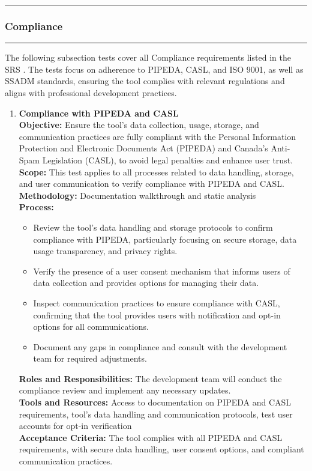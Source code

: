 \documentclass[12pt, titlepage]{article}
\newcommand{\colorrule}{\textcolor{BlueViolet}{\rule{\linewidth}{2pt}}}
\begin{document}
\newpage

\noindent
\colorrule

\subsubsection{Compliance}
\colorrule

\medskip

\noindent
The following subsection tests cover all Compliance requirements listed in the SRS \cite{SRS}. The tests focus on adherence to PIPEDA, CASL, and ISO 9001, as well as SSADM standards, ensuring the tool complies with relevant regulations and aligns with professional development practices.

\begin{enumerate}[label={\bf \textcolor{Maroon}{test-CPL-\arabic*}}, wide=0pt, font=\itshape]
  \item \textbf{Compliance with PIPEDA and CASL} \\[2mm]
    \textbf{Objective:} Ensure the tool’s data collection, usage, storage, and communication practices are fully compliant with the Personal Information Protection and Electronic Documents Act (PIPEDA) and Canada’s Anti-Spam Legislation (CASL), to avoid legal penalties and enhance user trust. \\[2mm]
    \textbf{Scope:} This test applies to all processes related to data handling, storage, and user communication to verify compliance with PIPEDA and CASL. \\[2mm]
    \textbf{Methodology:} Documentation walkthrough and static analysis \\[2mm]
    \textbf{Process:}
    \begin{itemize}
      \item Review the tool’s data handling and storage protocols to confirm compliance with PIPEDA, particularly focusing on secure storage, data usage transparency, and privacy rights.
      \item Verify the presence of a user consent mechanism that informs users of data collection and provides options for managing their data.
      \item Inspect communication practices to ensure compliance with CASL, confirming that the tool provides users with notification and opt-in options for all communications.
      \item Document any gaps in compliance and consult with the development team for required adjustments.
    \end{itemize}
    \textbf{Roles and Responsibilities:} The development team will conduct the compliance review and implement any necessary updates. \\[2mm]
    \textbf{Tools and Resources:} Access to documentation on PIPEDA and CASL requirements, tool’s data handling and communication protocols, test user accounts for opt-in verification \\[2mm]
    \textbf{Acceptance Criteria:} The tool complies with all PIPEDA and CASL requirements, with secure data handling, user consent options, and compliant communication practices.


\end{enumerate}
\end{document}
